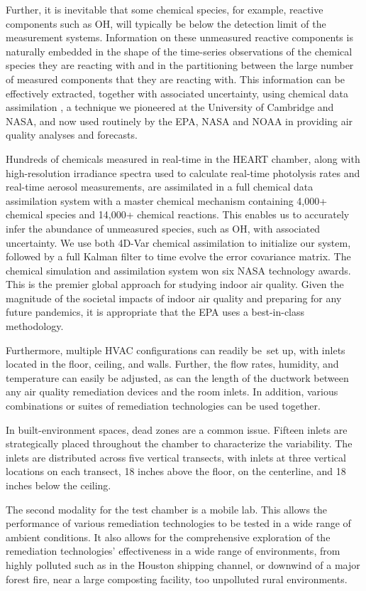 Further, it is inevitable that some chemical species, for example, reactive components such as OH, will typically be below the detection limit of the measurement systems. Information on these unmeasured reactive components is naturally embedded in the shape of the time-series observations of the chemical species they are reacting with and in the partitioning between the large number of measured components that they are reacting with. This information can be effectively extracted, together with associated uncertainty, using chemical data assimilation \cite{ISI:A1995TA29300008, Lary1999a, Lary2003a}, a technique we pioneered at the University of Cambridge and NASA, and now used routinely by the EPA, NASA and NOAA in providing air quality analyses and forecasts.

Hundreds of chemicals measured in real-time in the HEART chamber, along with high-resolution irradiance spectra used to calculate real-time photolysis rates and real-time aerosol measurements, are assimilated in a full chemical data assimilation system with a master chemical mechanism containing 4,000+ chemical species and 14,000+ chemical reactions. This enables us to accurately infer the abundance of unmeasured species, such as OH, with associated uncertainty. We use both 4D-Var chemical assimilation to initialize our system, followed by a full Kalman filter to time evolve the error covariance matrix. The chemical simulation and assimilation system won six NASA technology awards. This is the premier global approach for studying indoor air quality. Given the magnitude of the societal impacts of indoor air quality and preparing for any future pandemics, it is appropriate that the EPA uses a best-in-class methodology.

Furthermore, multiple HVAC configurations can readily be set up, with inlets located in the floor, ceiling, and walls. Further, the flow rates, humidity, and temperature can easily be adjusted, as can the length of the ductwork between any air quality remediation devices and the room inlets. In addition, various combinations or suites of remediation technologies can be used together.

In built-environment spaces, dead zones are a common issue. Fifteen inlets are strategically placed throughout the chamber to characterize the variability. The inlets are distributed across five vertical transects, with inlets at three vertical locations on each transect, 18 inches above the floor, on the centerline, and 18 inches below the ceiling.

The second modality for the test chamber is a mobile lab. This allows the performance of various remediation technologies to be tested in a wide range of ambient conditions. It also allows for the comprehensive exploration of the remediation technologies' effectiveness in a wide range of environments, from highly polluted such as in the Houston shipping channel, or downwind of a major forest fire, near a large composting facility, too unpolluted rural environments.





